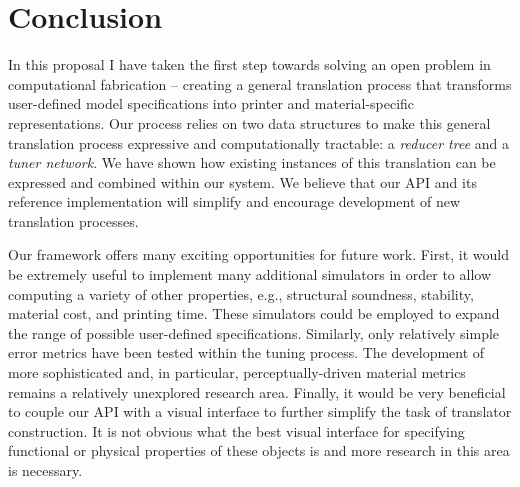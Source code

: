\chapter{Conclusion}
In this proposal I have taken the first step towards solving an open problem in computational fabrication --  creating a general translation process that transforms user-defined model specifications into printer and material-specific representations. Our process relies on two data structures to make this general translation process expressive and computationally tractable: a \emph{reducer tree} and a \emph{tuner network}. We have shown how existing instances of this translation can be expressed and combined within our system. We believe that our API and its reference implementation will simplify and encourage development of new translation processes.

Our framework offers many exciting opportunities for future work. First, it would be extremely useful to implement many additional simulators in order to allow computing a variety of other properties, e.g., structural soundness, stability, material cost, and printing time. These simulators could be employed to expand the range of possible user-defined specifications. Similarly, only relatively simple error metrics have been tested within the tuning process. The development of more sophisticated and, in particular, perceptually-driven material metrics remains a relatively unexplored research area. Finally, it would be very beneficial to couple our API with a visual interface to further simplify the task of translator construction. It is not obvious what the best visual interface for specifying functional or physical properties of these objects is and more research in this area is necessary.

